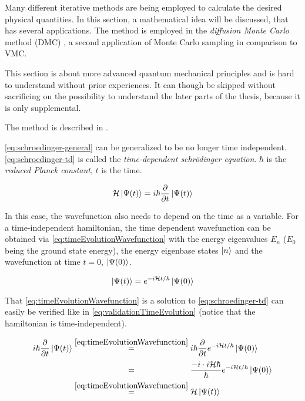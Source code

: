 Many different iterative methods are being employed to calculate the desired physical quantities.
In this section, a mathematical idea will be discussed, that has several applications.
The method is employed in the \emph{diffusion Monte Carlo} method (DMC) \cite{quantumMonteCarloSimulationsOfSolids}, a second application of Monte Carlo sampling in comparison to VMC.

This section is about more advanced quantum mechanical principles and is hard to understand without prior experiences. It can though be skipped without sacrificing on the possibility to understand the later parts of the thesis, because it is only supplemental.

The method is described in \cite{imagenarySchroedingerEquation}.

\autoref{eq:schroedinger-general} can be generalized to be no longer time independent. 
\autoref{eq:schroedinger-td} is called the \emph{time-dependent schrödinger equation}. $\hbar$ is the \emph{reduced Planck constant}, $t$ is the time.

\begin{equation}
    \label{eq:schroedinger-td}
    \mathcal{H} \ket{\Psi(t)} = i\hbar \frac{\partial }{\partial t} \ket{\Psi(t)}
\end{equation}

In this case, the wavefunction also needs to depend on the time as a variable.
For a time-independent hamiltonian, the time dependent wavefunction can be obtained via \autoref{eq:timeEvolutionWavefunction} \cite{schwablQM} with the energy eigenvalues $E_n$ ($E_0$ being the ground state energy), the energy eigenbase states $\ket{n}$ and the wavefunction at time $t=0$, $\ket{\Psi(0)}$.

\begin{equation}
    \label{eq:timeEvolutionWavefunction}
        \ket{\Psi(t)} = e^{-i\mathcal{H} t / \hbar} \ket{\Psi(0)}
\end{equation}

That \autoref{eq:timeEvolutionWavefunction} is a solution to \autoref{eq:schroedinger-td} can easily be verified like in \autoref{eq:validationTimeEvolution} (notice that the hamiltonian is time-independent).

\begin{equation}
    \label{eq:validationTimeEvolution}
    \begin{split}
        i\hbar \frac{\partial }{\partial t} \ket{\Psi(t)} &\stackrel{\ref{eq:timeEvolutionWavefunction}}{=} 
        i\hbar \frac{\partial }{\partial t}  e^{-i\hamiltonian t / \hbar} \ket{\Psi(0)}\\
        &\stackrel{\phantom{\ref{eq:timeEvolutionWavefunction}}}{=} \frac{-i\cdot i \hamiltonian \hbar}{\hbar} e^{-i\hamiltonian t / \hbar} \ket{\Psi(0)}\\
        &\stackrel{\ref{eq:timeEvolutionWavefunction}}{=} \hamiltonian \ket{\Psi(t)}
    \end{split}
\end{equation}

